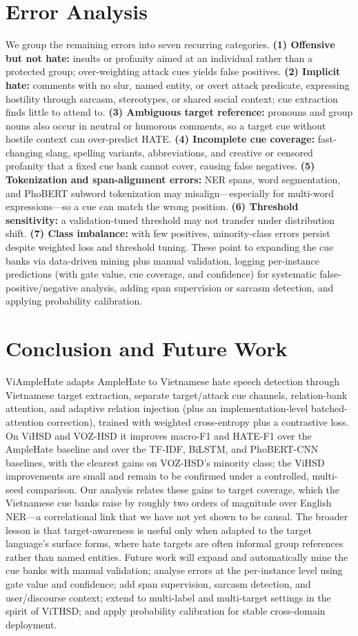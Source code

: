 \documentclass[11pt]{article}
\begin{document}
\section{Error Analysis}
We group the remaining errors into seven recurring categories. \textbf{(1) Offensive but not hate:} insults or profanity aimed at an individual rather than a protected group; over-weighting attack cues yields false positives. \textbf{(2) Implicit hate:} comments with no slur, named entity, or overt attack predicate, expressing hostility through sarcasm, stereotypes, or shared social context; cue extraction finds little to attend to. \textbf{(3) Ambiguous target reference:} pronouns and group nouns also occur in neutral or humorous comments, so a target cue without hostile context can over-predict HATE. \textbf{(4) Incomplete cue coverage:} fast-changing slang, spelling variants, abbreviations, and creative or censored profanity that a fixed cue bank cannot cover, causing false negatives. \textbf{(5) Tokenization and span-alignment errors:} NER spans, word segmentation, and PhoBERT subword tokenization may misalign---especially for multi-word expressions---so a cue can match the wrong position. \textbf{(6) Threshold sensitivity:} a validation-tuned threshold may not transfer under distribution shift. \textbf{(7) Class imbalance:} with few positives, minority-class errors persist despite weighted loss and threshold tuning. These point to expanding the cue banks via data-driven mining plus manual validation, logging per-instance predictions (with gate value, cue coverage, and confidence) for systematic false-positive/negative analysis, adding span supervision or sarcasm detection, and applying probability calibration.

\section{Conclusion and Future Work}
ViAmpleHate adapts AmpleHate to Vietnamese hate speech detection through Vietnamese target extraction, separate target/attack cue channels, relation-bank attention, and adaptive relation injection (plus an implementation-level batched-attention correction), trained with weighted cross-entropy plus a contrastive loss. On ViHSD and VOZ-HSD it improves macro-F1 and HATE-F1 over the AmpleHate baseline and over the TF-IDF, BiLSTM, and PhoBERT-CNN baselines, with the clearest gains on VOZ-HSD's minority class; the ViHSD improvements are small and remain to be confirmed under a controlled, multi-seed comparison. Our analysis relates these gains to target coverage, which the Vietnamese cue banks raise by roughly two orders of magnitude over English NER---a correlational link that we have not yet shown to be causal. The broader lesson is that target-awareness is useful only when adapted to the target language's surface forms, where hate targets are often informal group references rather than named entities. Future work will expand and automatically mine the cue banks with manual validation; analyse errors at the per-instance level using gate value and confidence; add span supervision, sarcasm detection, and user/discourse context; extend to multi-label and multi-target settings in the spirit of ViTHSD; and apply probability calibration for stable cross-domain deployment.
\end{document}
